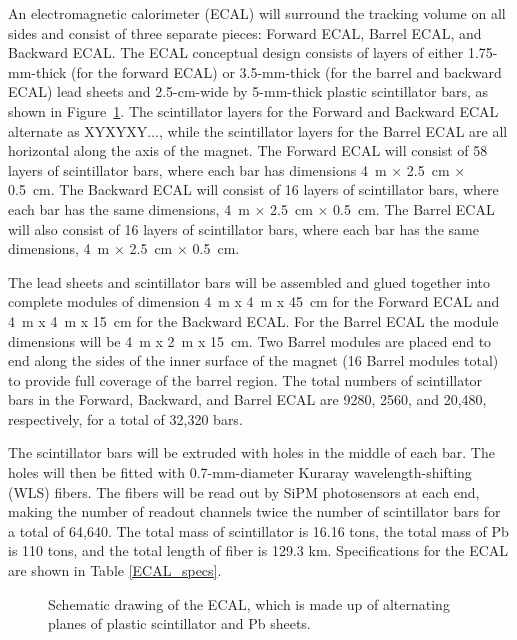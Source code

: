 An electromagnetic calorimeter 
(ECAL) will surround the tracking volume on all sides and consist of three separate pieces: Forward ECAL, Barrel ECAL, and Backward ECAL. 
The ECAL conceptual design 
consists of 
layers of either 1.75-mm-thick (for the forward ECAL) or 3.5-mm-thick 
(for the barrel and backward ECAL) lead sheets and 2.5-cm-wide by 5-mm-thick 
plastic scintillator bars,
as shown in Figure~\ref{ECAL_detail}. The scintillator layers for the
Forward and Backward ECAL alternate as XYXYXY..., while the scintillator 
layers for the Barrel ECAL are all horizontal along the axis of the magnet.
The Forward ECAL will consist of 58 layers of scintillator bars, where each
bar has dimensions 4~m $\times$ 2.5~cm $\times$ 0.5~cm. The
Backward ECAL will consist of 16 layers of scintillator bars, where each 
bar has the same dimensions, 4~m $\times$ 2.5~cm $\times$ 0.5~cm. The Barrel ECAL will also consist 
of 16 layers of scintillator bars, where each bar has the same dimensions, 
4~m $\times$ 2.5~cm $\times$ 0.5~cm. 

The lead sheets and scintillator bars will be assembled and glued together
into complete modules of dimension 4~m x 4~m x 45~cm for the Forward ECAL and
4~m x 4~m x 15~cm for the Backward ECAL. For the Barrel ECAL the module 
dimensions will be 4~m x 2~m x 15~cm. Two Barrel modules are placed end to
end along the sides of the inner surface of the magnet (16 Barrel modules
total) to provide full coverage of the barrel region.
The total numbers of scintillator bars in the
Forward, Backward, and Barrel ECAL are 9280, 2560, and 20,480, respectively, 
for a total of 32,320 bars. 

The scintillator bars will be extruded with 
holes in the middle of each bar. The
holes will then be fitted with 0.7-mm-diameter Kuraray wavelength-shifting (WLS) fibers.
The fibers will be read out by SiPM photosensors at each end, making the number of 
readout channels twice the number of scintillator bars 
for a total of 64,640. The total mass of scintillator is 16.16 tons, the total mass of Pb is 110 tons, and
the total length of fiber is 129.3 km.
Specifications for the ECAL are shown in Table \ref{ECAL_specs}.

\begin{figure}
\begin{center}
\caption[Schematic drawing of the ECAL]{\label{ECAL_detail} Schematic drawing of the ECAL, which is made up of alternating planes
of plastic scintillator and Pb sheets.}
\end{center}
\end{figure}

